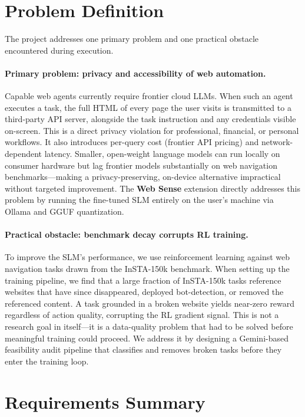 \documentclass[12pt,a4paper]{report}
\begin{document}
\section{Problem Definition}\label{sec:problem-def}

The project addresses one primary problem and one practical obstacle encountered during execution.

\paragraph{Primary problem: privacy and accessibility of web automation.}
Capable web agents currently require frontier cloud LLMs. When such an agent executes a task, the full HTML of every page the user visits is transmitted to a third-party API server, alongside the task instruction and any credentials visible on-screen. This is a direct privacy violation for professional, financial, or personal workflows. It also introduces per-query cost (frontier API pricing) and network-dependent latency. Smaller, open-weight language models can run locally on consumer hardware but lag frontier models substantially on web navigation benchmarks---making a privacy-preserving, on-device alternative impractical without targeted improvement. The \textbf{Web Sense} extension directly addresses this problem by running the fine-tuned SLM entirely on the user's machine via Ollama and GGUF quantization.

\paragraph{Practical obstacle: benchmark decay corrupts RL training.}
To improve the SLM's performance, we use reinforcement learning against web navigation tasks drawn from the InSTA-150k benchmark. When setting up the training pipeline, we find that a large fraction of InSTA-150k tasks reference websites that have since disappeared, deployed bot-detection, or removed the referenced content. A task grounded in a broken website yields near-zero reward regardless of action quality, corrupting the RL gradient signal. This is not a research goal in itself---it is a data-quality problem that had to be solved before meaningful training could proceed. We address it by designing a Gemini-based feasibility audit pipeline that classifies and removes broken tasks before they enter the training loop.

\section{Requirements Summary}\label{sec:requirements}
\end{document}
